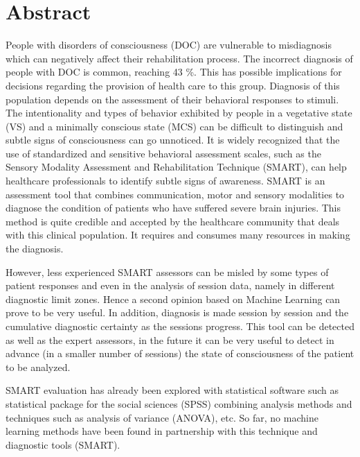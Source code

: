 \setlength{\parindent}{4em}
\chapter*{Abstract}


\hspace{4em} People with disorders of consciousness (DOC) are vulnerable to misdiagnosis which can negatively affect their rehabilitation process. The incorrect diagnosis of people with DOC is common, reaching 43 \%. This has possible implications for decisions regarding the provision of health care to this group. Diagnosis of this population depends on the assessment of their behavioral responses to stimuli. The intentionality and types of behavior exhibited by people in a vegetative state (VS) and a minimally conscious state (MCS) can be difficult to distinguish and subtle signs of consciousness can go unnoticed.
It is widely recognized that the use of standardized and sensitive behavioral assessment scales, such as the Sensory Modality Assessment and Rehabilitation Technique (SMART), can help healthcare professionals to identify subtle signs of awareness.
SMART is an assessment tool that combines communication, motor and sensory modalities to diagnose the condition of patients who have suffered severe brain injuries. This method is quite credible and accepted by the healthcare community that deals with this clinical population. It requires and consumes many resources in making the diagnosis.

However, less experienced SMART assessors can be misled by some types of patient responses and even in the analysis of session data, namely in different diagnostic limit zones. Hence a second opinion based on Machine Learning can prove to be very useful. In addition, diagnosis is made session by session and the cumulative diagnostic certainty as the sessions progress.
This tool can be detected as well as the expert assessors, in the future it can be very useful to detect in advance (in a smaller number of sessions) the state of consciousness of the patient to be analyzed.

SMART evaluation has already been explored with statistical software such as statistical package for the social sciences (SPSS) combining analysis methods and techniques such as analysis of variance (ANOVA), etc.
So far, no machine learning methods have been found in partnership with this technique and diagnostic tools (SMART).  


